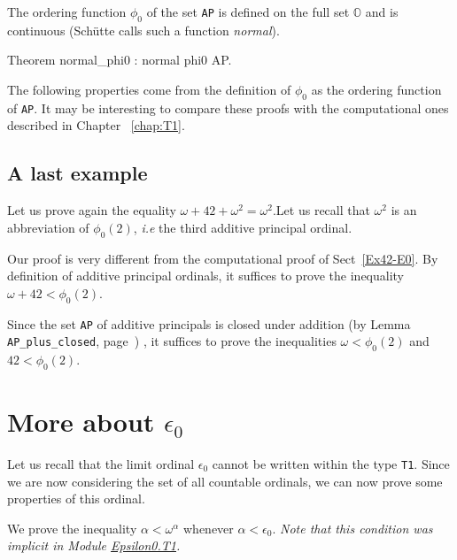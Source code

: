 {The ordering function $\phi_0$ of the set \texttt{AP} is defined on the full set $\mathbb{O}$ and is continuous (Schütte calls such a  function  \emph{normal}).

\begin{Coqsrc}
Theorem normal_phi0 : normal phi0 AP.
\end{Coqsrc}

The following properties come from  the definition of $\phi_0$ as the ordering function of \texttt{AP}. It may be interesting to compare these proofs with the computational ones described in Chapter ~\ref{chap:T1}.



\subsection{A last example}
\label{Ex42-schutte}

Let us prove again the equality $\omega+42+\omega^2= \omega^2$.Let us recall that $\omega^2$ is an abbreviation of $\phi_0(2)$,
\emph{i.e} the third  additive principal ordinal.



Our proof is very different from the computational proof of Sect~\vref{Ex42-E0}.
By definition of additive principal ordinals, 
it suffices to prove the inequality $\omega+42< \phi_0(2)$.


Since the set \texttt{AP} of additive principals  is closed under addition
(by Lemma \texttt{AP\_plus\_closed}, page~\pageref{lemma:AP-plus-closed}) , it suffices to prove the inequalities $\omega<\phi_0(2)$ and $42<\phi_0(2)$.


\section{More about \texorpdfstring{$\epsilon_0$}{\texttt{epsilon0}}}

Let us recall that the limit ordinal  $\epsilon_0$ cannot be written within the type \texttt{T1}. Since we are now considering the set of all countable ordinals, we can now prove some properties of this ordinal.


We prove the inequality  $\alpha<\omega^\alpha$ whenever $\alpha < \epsilon_0$.
\emph{Note that this condition was implicit in Module
\href{../theories/html/hydras.Epsilon0.T1.html\#lt_phi0}{Epsilon0.T1}.}

}
